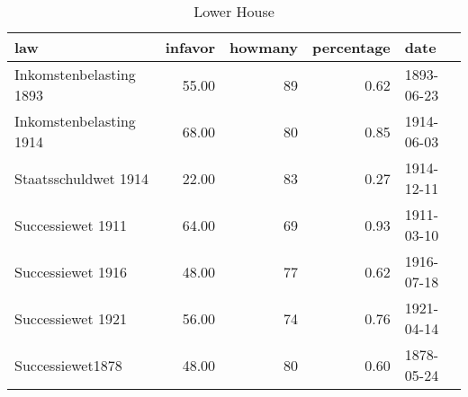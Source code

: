 \begin{table}[ht]
\centering
\begin{tabular}{lrrrl}
  \hline
law & infavor & howmany & percentage & date \\ 
  \hline
Inkomstenbelasting 1893 & 55.00 &  89 & 0.62 & 1893-06-23 \\ 
  Inkomstenbelasting 1914 & 68.00 &  80 & 0.85 & 1914-06-03 \\ 
  Staatsschuldwet 1914 & 22.00 &  83 & 0.27 & 1914-12-11 \\ 
  Successiewet 1911 & 64.00 &  69 & 0.93 & 1911-03-10 \\ 
  Successiewet 1916 & 48.00 &  77 & 0.62 & 1916-07-18 \\ 
  Successiewet 1921 & 56.00 &  74 & 0.76 & 1921-04-14 \\ 
  Successiewet1878 & 48.00 &  80 & 0.60 & 1878-05-24 \\ 
   \hline
\end{tabular}
\caption{Lower House} 
\end{table}
